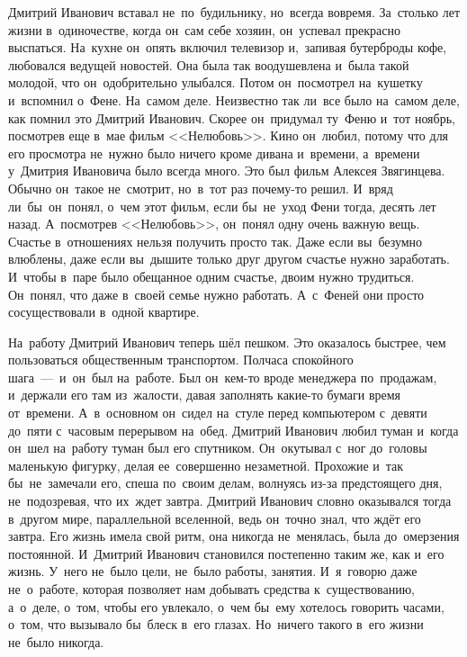 Дмитрий Иванович вставал не~по~будильнику, но~всегда вовремя.
За~столько лет жизни в~одиночестве, когда он~сам себе хозяин, он~успевал прекрасно выспаться.
На~кухне он~опять включил телевизор и,~запивая бутерброды кофе, любовался ведущей новостей.
Она была так воодушевлена и~была такой молодой, что он~одобрительно улыбался.
Потом он~посмотрел на~кушетку и~вспомнил о~Фене.
На~самом деле.
Неизвестно так ли~все было на~самом деле, как помнил это Дмитрий Иванович.
Скорее он~придумал ту~Феню и~тот ноябрь, посмотрев еще в~мае фильм <<Нелюбовь>>.
Кино он~любил, потому что для его просмотра не~нужно было ничего кроме дивана и~времени, а~времени у~Дмитрия Ивановича было всегда много.
Это был фильм Алексея Звягинцева.
Обычно он~такое не~смотрит, но~в~тот раз почему-то решил.
И~вряд ли~бы~он~понял, о~чем этот фильм, если бы~не~уход Фени тогда, десять лет назад.
А~посмотрев <<Нелюбовь>>, он~понял одну очень важную вещь.
Счастье в~отношениях нельзя получить просто так.
Даже если вы~безумно влюблены, даже если вы~дышите только друг другом счастье нужно заработать.
И~чтобы в~паре было обещанное одним счастье, двоим нужно трудиться.
Он~понял, что даже в~своей семье нужно работать.
А~с~Феней они просто сосуществовали в~одной квартире.
 
На~работу Дмитрий Иванович теперь шёл пешком.
Это оказалось быстрее, чем пользоваться общественным транспортом.
Полчаса спокойного шага~---~и~он~был на~работе.
Был он~кем-то вроде менеджера по~продажам, и~держали его там из~жалости, давая заполнять какие-то бумаги время от~времени.
А~в~основном он~сидел на~стуле перед компьютером с~девяти до~пяти с~часовым перерывом на~обед.
Дмитрий Иванович любил туман и~когда он~шел на~работу туман был его спутником.
Он~окутывал с~ног до~головы маленькую фигурку, делая ее~совершенно незаметной.
Прохожие и~так бы~не~замечали его, спеша по~своим делам, волнуясь из-за предстоящего дня, не~подозревая, что их~ждет завтра.
Дмитрий Иванович словно оказывался тогда в~другом мире, параллельной вселенной, ведь он~точно знал, что ждёт его завтра.
Его жизнь имела свой ритм, она никогда не~менялась, была до~омерзения постоянной.
И~Дмитрий Иванович становился постепенно таким же, как и~его жизнь.
У~него не~было цели, не~было работы, занятия.
И~я~говорю даже не~о~работе, которая позволяет нам добывать средства к~существованию, а~о~деле, о~том, чтобы его увлекало, о~чем бы~ему хотелось говорить часами, о~том, что вызывало бы~блеск в~его глазах.
Но~ничего такого в~его жизни не~было никогда.

